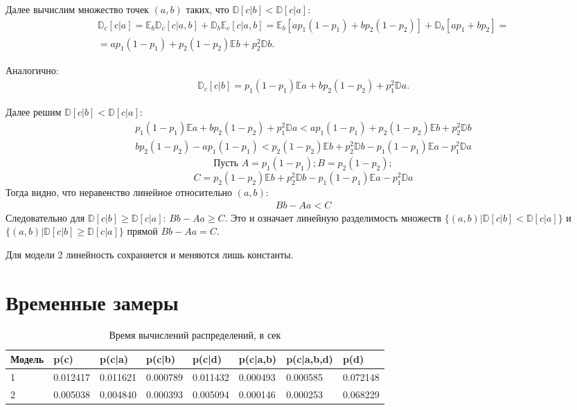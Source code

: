 \documentclass[12pt, a4paper]{article}
\begin{document}
        Далее вычислим множество точек $(a, b)$ таких, что $\mathbb{D}[c|b] < \mathbb{D}[c|a]$:
        \begin{gather}
            \mathbb{D}_c[c|a] = \mathbb{E}_b\mathbb{D}_c[c|a,b] + \mathbb{D}_b\mathbb{E}_c[c|a,b] =
            \mathbb{E}_b[ap_1(1-p_1) + bp_2(1-p_2)] + \mathbb{D}_b[ap_1 + bp_2] = \nonumber \\
            = ap_1(1-p_1) + p_2(1-p_2)\mathbb{E}b + p_2^2\mathbb{D}b.
        \end{gather}

        Аналогично:
        \begin{gather}
            \mathbb{D}_c[c|b] = p_1(1-p_1)\mathbb{E}a + bp_2(1-p_2) + p_1^2\mathbb{D}a.
        \end{gather}

        Далее решим $\mathbb{D}[c|b] < \mathbb{D}[c|a]$:
        \begin{gather}
            p_1(1-p_1)\mathbb{E}a + bp_2(1-p_2) + p_1^2\mathbb{D}a < ap_1(1-p_1) + p_2(1-p_2)\mathbb{E}b + p_2^2\mathbb{D}b \nonumber \\
            bp_2(1-p_2) - ap_1(1-p_1) < p_2(1-p_2)\mathbb{E}b + p_2^2\mathbb{D}b - p_1(1-p_1)\mathbb{E}a - p_1^2\mathbb{D}a \nonumber
        \end{gather}
        $$
        \text{Пусть } A = p_1(1 - p_1); B = p_2(1 - p_2);
        $$
        $$
        C = p_2(1-p_2)\mathbb{E}b + p_2^2\mathbb{D}b - p_1(1-p_1)\mathbb{E}a - p_1^2\mathbb{D}a
        $$
        Тогда видно, что неравенство линейное относительно $(a,b)$:
        \begin{gather}
            Bb - Aa < C
        \end{gather}
        Следовательно для $\mathbb{D}[c|b] \geq \mathbb{D}[c|a]$: $Bb - Aa \geq C$. Это и означает линейную разделимость множеств $\{(a, b) | \mathbb{D}[c|b] < \mathbb{D}[c|a] \}$ и $\{(a, b) | \mathbb{D}[c|b] \geq \mathbb{D}[c|a]\}$ прямой $Bb - Aa = C$.

        Для модели 2 линейность сохраняется и меняются лишь константы.

    \section{Временные замеры}\label{sec:time}
        \begin{table}[h]
            \caption{Время вычислений распределений, в сек}
            \label{tab:time}
            \begin{tabular}{l | l | l | l | l | l | l | l}
            \textbf{Модель} & \textbf{p(c)} & \textbf{p(c|a)} & \textbf{p(c|b)} & \textbf{p(c|d)} & \textbf{p(c|a,b)} & \textbf{p(c|a,b,d)} & \textbf{p(d)}\\
            \hline
            1 & 0.012417 & 0.011621 & 0.000789 & 0.011432 & 0.000493 & 0.000585 & 0.072148\\
            2 & 0.005038 & 0.004840 & 0.000393 & 0.005094 & 0.000146 & 0.000253 & 0.068229\\
            \end{tabular}
        \end{table}
\end{document}
